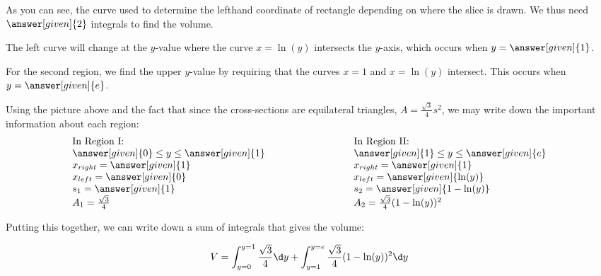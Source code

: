 \documentclass{ximera}
\begin{document}
\begin{example}
\begin{explanation}
\begin{image}
            \end{image}
As you can see, the curve used to determine the lefthand coordinate of rectangle  depending on where the slice is drawn.  We thus need $\answer[given]{2}$ integrals to find the volume.


The left curve will change at the $y$-value where the curve $x=\ln(y)$ intersects the $y$-axis, which occurs when $y=\answer[given]{1}$.  

For the second region, we find the upper $y$-value by requiring that the curves $x=1$ and $x=\ln(y)$ intersect. This occurs when $y=\answer[given]{e}$.

Using the picture above and the fact that since the cross-sections are equilateral triangles, $A= \frac{\sqrt{3}}{4}s^2$, we may write down the important information about each region: 
\[
\begin{array}{ll}
\text{In Region I:}  & \text{In Region II:}  \\
\answer[given]{0} \le y \le \answer[given]{1}  \qquad \qquad \qquad \qquad & \answer[given]{1} \le y \le \answer[given]{e}\\
x_{right} = \answer[given]{1}    &  x_{right} = \answer[given]{1} \\
x_{left} = \answer[given]{0}  & x_{left} = \answer[given]{\ln(y)} \\
s_1= \answer[given]{1} & s_2= \answer[given]{1-\ln(y)} \\
A_1 = \frac{\sqrt{3}}{4} &  A_2  = \frac{\sqrt{3}}{4}(1-\ln(y))^2 \\
\end{array}
\]

Putting this together, we can write down a sum of integrals that gives the volume:

\[V= \int_{y= 0}^{y=1}\frac{\sqrt{3}}{4} \d y + \int_{y= 1}^{y=e} \frac{\sqrt{3}}{4}(1-\ln(y))^2 \d y \]
  
\end{explanation}            
\end{example}
\end{document}

